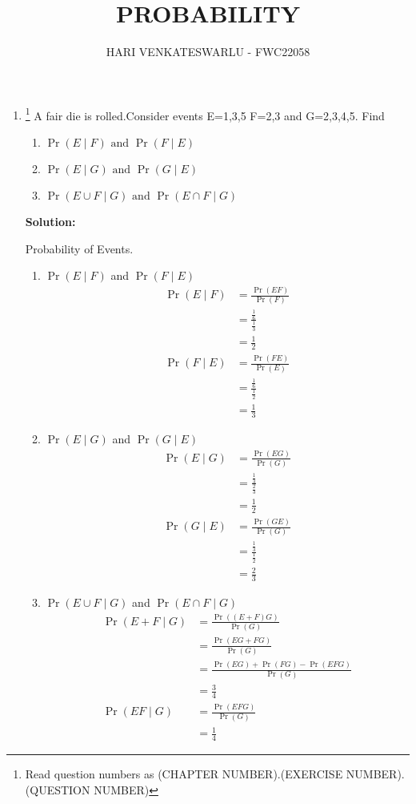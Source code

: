 \documentclass{article}
\providecommand{\pr}[1]{\ensuremath{\Pr\left(#1\right)}}
\newcommand{\solution}{\noindent \textbf{Solution: }}
\providecommand{\pr}[1]{\ensuremath{\Pr\left(#1\right)}}
\begin{document}
\title{PROBABILITY}
\author{\Large HARI VENKATESWARLU - FWC22058}
\date{}

\maketitle

\begin{enumerate}[label=13.\arabic{enumi}.\arabic{enumii}]%
\setcounter{enumi}{0}
\setcounter{enumii}{11}

\item \footnote{Read question numbers as (CHAPTER NUMBER).(EXERCISE NUMBER).(QUESTION NUMBER)} {A fair die is rolled.Consider events E=1,3,5 F=2,3 and G=2,3,4,5. Find}
\begin{enumerate}
\item $\pr{E \mid F} \text{ and } \pr{F \mid E}$
\item $\pr{E \mid G} \text{ and } \pr{G \mid E}$
\item $\pr{{E \cup F} \mid G} \text{ and } \pr{{E \cap F} \mid G}$
\end{enumerate}
	\solution\\
	\begin{table}[h]\centering
	
	\caption{Probability of Events.}
	\label{table1:}
\end{table}
\begin{enumerate}
\item $\pr{E \mid F}$ and $\pr{F \mid E}$
\begin{align}
\pr{E \mid F} &= \frac{\pr{EF}}{\pr{F}}\\
&=\frac{\frac{1}{6}}{\frac{1}{3}}\\
&=\frac{1}{2}\\
\pr{F \mid E} &= \frac{\pr{FE}}{\pr{E}}\\
&= \frac{\frac{1}{6}}{\frac{1}{2}}\\
&=\frac{1}{3}
\end{align}
\item $\pr{E \mid G}$ and $\pr{G \mid E}$
\begin{align}
\pr{E \mid G} &= \frac{\pr{EG}}{\pr{G}}\\
&=\frac{\frac{1}{3}}{\frac{2}{3}}\\
&=\frac{1}{2}\\
\pr{G \mid E} &= \frac{\pr{GE}}{\pr{G}}\\
&=\frac{\frac{1}{3}}{\frac{1}{2}}\\
&=\frac{2}{3}
\end{align}
\item $\pr{{E \cup F} \mid G}$ and $\pr{{E \cap F} \mid G}$
\begin{align}
\pr{{E+F} \mid G} &= \frac{\pr{{(E+F)}G}}{\pr{G}}\\
&=\frac{\pr{{EG+F}G}}{\pr{G}}\\
&=\frac{\pr{EG}+\pr{FG}-\pr{EFG}}{\pr{G}}\\
&=\frac{3}{4}\\
\pr{{EF} \mid G} &= \frac{\pr{EFG}}{\pr{G}}\\
&=\frac{1}{4}
\end{align}
\end{enumerate}
\end{enumerate}
\end{document}
